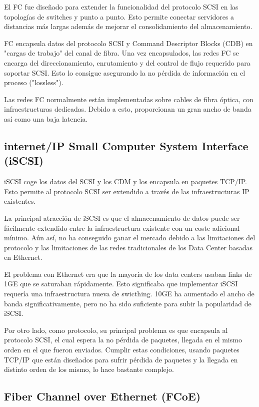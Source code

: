 El FC fue diseñado para extender la funcionalidad del protocolo SCSI en las topologías de switches y punto a punto. Esto permite conectar servidores a distancias más largas además de mejorar el consolidamiento del almacenamiento.

FC encapsula datos del protocolo SCSI y Command Descriptor Blocks (CDB) en "cargas de trabajo" del canal de fibra. Una vez encapsulados, las redes FC se encarga del direccionamiento, enrutamiento y del control de flujo requerido para soportar SCSI. Esto lo consigue asegurando la no pérdida de información en el proceso ("lossless").

Las redes FC normalmente están implementadas sobre cables de fibra óptica, con infraestructuras dedicadas. Debido a esto, proporcionan un gran ancho de banda así como una baja latencia.

\subsection{internet/IP Small Computer System Interface (iSCSI)}

iSCSI coge los datos del SCSI y los CDM y los encapsula en paquetes TCP/IP. Esto permite al protocolo SCSI ser extendido a través de las infraestructuras IP existentes.

La principal atracción de iSCSI es que el almacenamiento de datos puede ser fácilmente extendido entre la infraestructura existente con un coste adicional mínimo. Aún así, no ha conseguido ganar el mercado debido a las limitaciones del protocolo y las limitaciones de las redes tradicionales de los Data Center basadas en Ethernet.

El problema con Ethernet era que la mayoría de los data centers usaban links de 1GE que se saturaban rápidamente. Esto significaba que implementar iSCSI requería una infraestructura nueva de swicthing. 10GE ha aumentado el ancho de banda significativamente, pero no ha sido suficiente para subir la popularidad de iSCSI.

Por otro lado, como protocolo, su principal problema es que encapsula al protocolo SCSI, el cual espera la no pérdida de paquetes, llegada en el mismo orden en el que fueron enviados. Cumplir estas condiciones, usando paquetes TCP/IP que están diseñados para sufrir pérdida de paquetes y la llegada en distinto orden de los mismo, lo hace bastante complejo.

\subsection{Fiber Channel over Ethernet (FCoE)}

